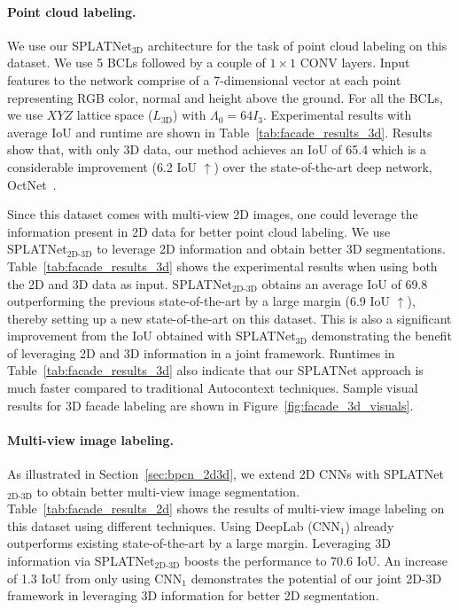 \documentclass[10pt,twocolumn,letterpaper]{article}
\def\model{SPLATNet\xspace}
\def\modelthree{SPLATNet$_{\text{3D}}$\xspace}
\def\modeljoint{SPLATNet$_{\text{2D-3D}}$\xspace}
\begin{document}
\vspace{-0.35cm}\paragraph{Point cloud labeling.} We use our \modelthree architecture for the task
of point cloud labeling on this dataset. We use 5 BCLs followed by a couple of 
$1\times1$ CONV layers. Input features to the network
comprise of a 7-dimensional vector at each point representing RGB color, normal and height above the ground. For all the BCLs, we use $XYZ$ lattice space ($L_{\text{3D}}$) with $\Lambda_0 = 64I_3$. Experimental results with average IoU and runtime are shown in 
Table~\ref{tab:facade_results_3d}. Results show that, with only 3D data, 
our method achieves an IoU of 65.4 which is a considerable improvement (6.2 IoU $\uparrow$) over the state-of-the-art deep network, OctNet~\cite{riegler2017octnet}.

Since this dataset comes with multi-view 2D images, one could leverage the
information present in 2D data for better point cloud labeling. 
We use \modeljoint to leverage 2D information and obtain better 3D segmentations. Table~\ref{tab:facade_results_3d} shows the experimental results when using
both the 2D and 3D data as input. \modeljoint obtains an average IoU of 69.8 outperforming
the previous state-of-the-art by a large margin (6.9 IoU $\uparrow$), thereby setting up a new
state-of-the-art on this dataset. This is also a significant improvement from the IoU obtained
with \modelthree demonstrating the benefit of leveraging 2D and 3D information in a joint
framework. Runtimes in Table~\ref{tab:facade_results_3d} also indicate that
our \model approach is much faster compared to traditional Autocontext techniques.
Sample visual results for 3D facade labeling are shown in Figure~\ref{fig:facade_3d_visuals}.

\vspace{-0.35cm}\paragraph{Multi-view image labeling.} As illustrated in Section~\ref{sec:bpcn_2d3d}, we extend
2D CNNs with \modeljoint to obtain better multi-view image segmentation.
Table~\ref{tab:facade_results_2d} shows the results of multi-view image labeling on this dataset
using different techniques. Using DeepLab (CNN$_1$) already outperforms existing state-of-the-art
by a large margin. Leveraging 3D information via \modeljoint boosts
the performance to 70.6 IoU. An increase of 1.3 IoU from only using CNN$_1$ demonstrates
the potential of our joint 2D-3D framework in leveraging 3D information for better 2D segmentation.
\end{document}
